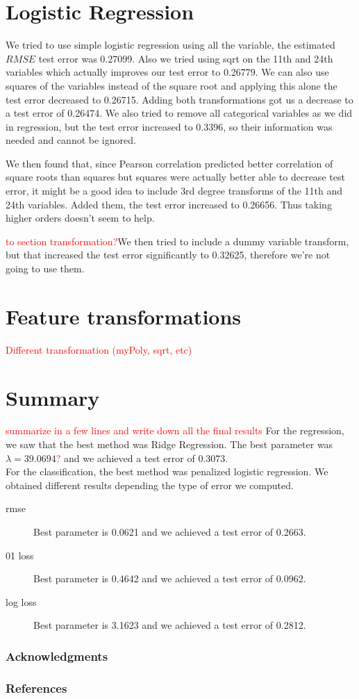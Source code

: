 \documentclass{article} %
\begin{document}
\section{Logistic Regression}
We tried to use simple logistic regression using all the variable, the estimated $RMSE$ test error was 0.27099. Also we tried using sqrt on the 11th and 24th variables which actually improves our test error to 0.26779. We can also use squares of the variables instead of the square root and applying this alone the test error decreased to 0.26715. Adding both transformations got us a decrease to a test error of 0.26474. We also tried to remove all categorical variables as we did in regression, but the test error increased to 0.3396, so their information was needed and cannot be ignored.

We then found that, since Pearson correlation predicted better correlation of square roots than squares but squares were actually better able to decrease test error, it might be a good idea to include 3rd degree transforms of the 11th and 24th variables. Added them, the test error increased to 0.26656. Thus taking higher orders doesn’t seem to help.

\textcolor{red}{to section transformation?}We then tried to include a dummy variable transform, but that increased the test error significantly to 0.32625, therefore we’re not going to use them.
\section{Feature transformations}
\textcolor{red}{Different transformation (myPoly, sqrt, etc)}
\section{Summary}
\textcolor{red}{summarize in a few lines and write down all the final results}
For the regression, we saw that the best method was Ridge Regression. The best parameter was $\lambda =  39.0694$\textcolor{red}{?} and we achieved a test error of 0.3073.\\

For the classification, the best method was penalized logistic regression. We obtained different results depending the type of error we computed. \begin{description}
\item[rmse] Best parameter is 0.0621 and we achieved a test error of 0.2663.
\item[01 loss]Best parameter is 0.4642 and we achieved a test error of 0.0962.
\item[log loss] Best parameter is 3.1623 and we achieved a test error of 0.2812.
\end{description}

\subsubsection*{Acknowledgments}


\subsubsection*{References}
\end{document}
